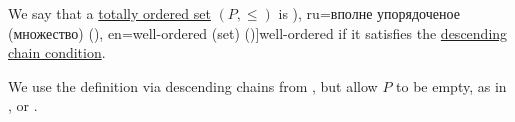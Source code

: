 \begin{definition}\label{def:well_ordered_set}\mimprovised
  We say that a \hyperref[def:totally_ordered_set]{totally ordered set} \( (P, \leq) \) is \term[bg=добра (верига) (\cite[14]{Проданов1982ФункционаленАнализЧаст1}), ru=вполне упорядоченое (множество) (\cite[def. 3.15]{Гуров2013ТеорияРешёток}), en=well-ordered (set) (\cite[180]{Birkhoff1967LatticeTheory})]{well-ordered} if it satisfies the \hyperref[def:chain_condition]{descending chain condition}.
\end{definition}
\begin{comments}
  \item We use the definition via descending chains from \textcite[180]{Birkhoff1967LatticeTheory}, but allow \( P \) to be empty, as in
  \cite[def. 9.8]{Harzheim2005OrderedSets},
  \cite[def. 3.15]{Гуров2013ТеорияРешёток} or
  \cite[16]{Проданов1982ФункционаленАнализЧаст1}.
\end{comments}


